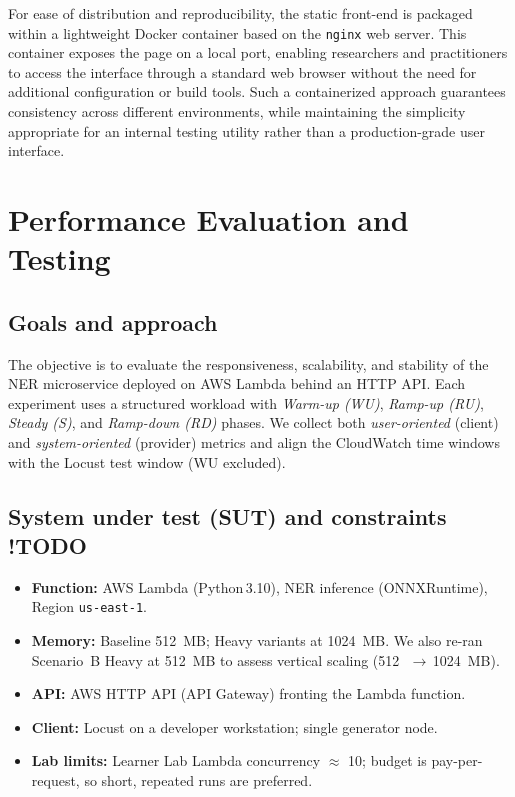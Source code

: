 \documentclass[11pt,a4paper]{article}
\begin{document}
For ease of distribution and reproducibility, the static front-end is packaged within a lightweight Docker container based on the \texttt{nginx} web server. This container exposes the page on a local port, enabling researchers and practitioners to access the interface through a standard web browser without the need for additional configuration or build tools. Such a containerized approach guarantees consistency across different environments, while maintaining the simplicity appropriate for an internal testing utility rather than a production-grade user interface.

\section{Performance Evaluation and Testing}\label{sec:testing}

\subsection{Goals and approach}
The objective is to evaluate the responsiveness, scalability, and stability of the NER microservice deployed on AWS Lambda behind an HTTP API. Each experiment uses a structured workload with \emph{Warm-up (WU)}, \emph{Ramp-up (RU)}, \emph{Steady (S)}, and \emph{Ramp-down (RD)} phases. We collect both \emph{user-oriented} (client) and \emph{system-oriented} (provider) metrics and align the CloudWatch time windows with the Locust test window (WU excluded).

\subsection{System under test (SUT) and constraints !TODO}
\begin{itemize}
  \item \textbf{Function:} AWS Lambda (Python\,3.10), NER inference (ONNXRuntime), Region \texttt{us-east-1}.
  \item \textbf{Memory:} Baseline \SI{512}{MB}; Heavy variants at \SI{1024}{MB}. We also re-ran Scenario~B Heavy at \SI{512}{MB} to assess vertical scaling (\SI{512}\,$\rightarrow$\,\SI{1024}{MB}).
  \item \textbf{API:} AWS HTTP API (API Gateway) fronting the Lambda function.
  \item \textbf{Client:} Locust on a developer workstation; single generator node.
  \item \textbf{Lab limits:} Learner Lab Lambda concurrency $\approx$ 10; budget is pay-per-request, so short, repeated runs are preferred.
\end{itemize}
\end{document}
